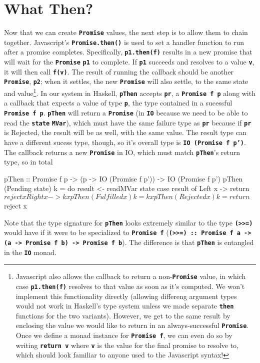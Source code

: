 \documentclass[12pt, english, letterpaper]{kuthesis}
\newcommand{\lit}[1]{\textbf{\texttt{#1}}}
\begin{document}
\section*{What Then?}
Now that we can create \lit{Promise} values, the next step is to allow them to chain together.  Javascript's \lit{Promise.then()} is used to set a handler function to run after a promise completes.  Specifically, \lit{p1.then(f)} results in a new promise that will wait for the \lit{Promise} \lit{p1} to complete.  If \lit{p1} succeeds and resolves to a value \lit v, it will then call \lit{f(v)}.  The result of running the callback should be another \lit{Promise}, \lit{p2}; when it settles, the new \lit{Promise} will also settle, to the same state and value\footnote{Javascript also allows the callback to return a non-\lit{Promise} value, in which case \lit{p1.then(f)} resolves to that value as soon as it's computed.  We won't implement this functionality directly
(allowing differeng argument types would not work in Haskell's type system unless we made separate \lit{then} functions for the two variants).  However, we get to the same result by enclosing the value we would like to return in an always-successful \lit{Promise}.  Once we define a monad instance for \lit{Promise f}, we can even do so by writing \lit{return v} where \lit{v} is the value for the final promise to resolve to, which should look familiar to anyone used to the Javascript syntax!}.
In our system in Haskell, \lit{pThen} accepts \lit{pr}, a \lit{Promise f p} along with a callback that expects a value of type \lit p, the type contained in a sucessful \lit{Promise f p}.  \lit{pThen} will return a \lit{Promise} (in \lit{IO} because we need to be able to read the \lit{state} \lit{MVar}), which must have the same failure type as \lit{pr} because if \lit{pr} is Rejected, the result will be as well, with the same value.  The result type can have a different sucess type, though, so it's overall type is \lit{IO (Promise f p')}.  The callback returns a new \lit{Promise} in IO, which must match \lit{pThen}'s return type, so in total
\begin{code}
pThen :: Promise f p
        -> (p -> IO (Promise f p'))
        -> IO (Promise f p')
pThen (Pending state) k = do
  result <- readMVar state
  case result of
    Left x -> return $ reject x
    Right x -> k x
pThen (Fulfilled x) k = k x
pThen (Rejected x) k = return $ reject x
\end{code}
      
Note that the type signature for \lit{pThen} looks extremely similar to the type \lit{(>>=)} would have if it were to be specialized to \lit{Promise f} (\lit{(>>=) ::\ Promise f a -> (a -> Promise f b) -> Promise f b}).  The difference is that \lit{pThen} is entangled in the \lit{IO} monad.
\end{document}
